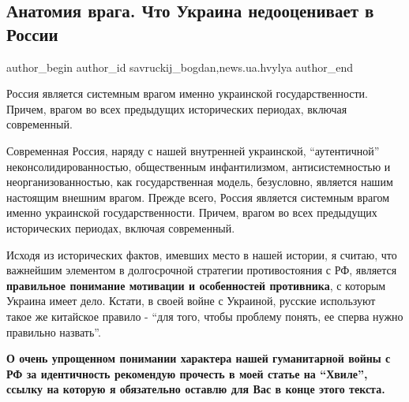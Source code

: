  
 
 
 
 
\subsection{Анатомия врага. Что Украина недооценивает в России}
\label{sec:16_01_2022.stz.news.ua.hvylya.1.anatomia_vraga}

\ifcmt
 author_begin
   author_id savruckij_bogdan,news.ua.hvylya
 author_end
\fi

\begin{zznagolos}
Россия является системным врагом именно украинской государственности. Причем,
врагом во всех предыдущих исторических периодах, включая современный.
\end{zznagolos}


Современная Россия, наряду с нашей внутренней украинской, \enquote{аутентичной}
неконсолидированностью, общественным инфантилизмом, антисистемностью и
неорганизованностью, как государственная модель, безусловно, является нашим
настоящим внешним врагом. Прежде всего, Россия является системным врагом именно
украинской государственности. Причем, врагом во всех предыдущих исторических
периодах, включая современный.

Исходя из исторических фактов, имевших место в нашей истории, я считаю, что
важнейшим элементом в долгосрочной стратегии противостояния с РФ, является
\textbf{правильное понимание мотивации и особенностей противника}, с которым Украина
имеет дело. Кстати, в своей войне с Украиной, русские используют такое же
китайское правило - \enquote{для того, чтобы проблему понять, ее сперва нужно
правильно назвать}.

\textbf{О очень упрощенном понимании характера нашей гуманитарной войны с РФ за
идентичность рекомендую прочесть в моей статье на \enquote{Хвиле}, ссылку на
которую я обязательно оставлю для Вас в конце этого текста.}

